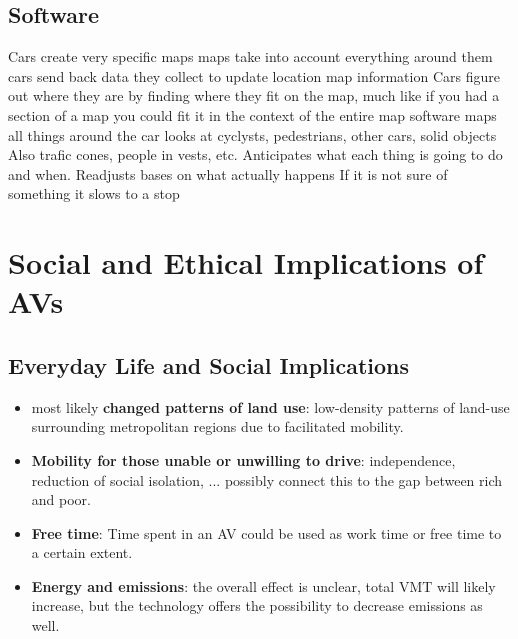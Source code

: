 \documentclass[11pt]{article}
\begin{document}
\subsection{Software}
Cars create very specific maps
    maps take into account everything around them
    cars send back data they collect to update location map information
Cars figure out where they are by finding where they fit on the map, much like if you had a section of a map you could fit it in the context of the entire map
software maps all things around the car
looks at cyclysts, pedestrians, other cars, solid objects
Also trafic cones, people in vests, etc. 
Anticipates what each thing is going to do and when. 
Readjusts bases on what actually happens 
If it is not sure of something it slows to a stop


\section{Social and Ethical Implications of AVs}

\subsection{Everyday Life and Social Implications}
\cite{Rand:16}
\begin{itemize}
\item most likely \textbf{changed patterns of land use}: low-density patterns of land-use surrounding metropolitan regions due to facilitated mobility.
\item \textbf{Mobility for those unable or unwilling to drive}: independence, reduction of social isolation, ... possibly connect this to the gap between rich and poor.
\item \textbf{Free time}: Time spent in an AV could be used as work time or free time to a certain extent.
\item \textbf{Energy and emissions}: the overall effect is unclear, total VMT will likely increase, but the technology offers the possibility to decrease emissions as well. 
\end{itemize}
\end{document}
